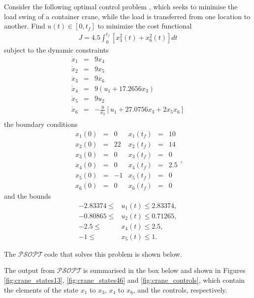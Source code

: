 \documentclass[a4paper,11pt]{report}    %
\newcommand{\psopt}{$\mathcal{PSOPT}$\,}  %
\newenvironment{shadedframe}{%
  \def\FrameCommand{\fcolorbox{black}{shadecolor}}%
  \MakeFramed {\FrameRestore}}
{\endMakeFramed}
\begin{document}
Consider the following optimal control problem \cite{Teo:91}, which seeks to minimise
the load swing of a container crane, while the load is transferred from one location
to another.  Find  $u(t) \in [0, t_f]$ to minimize the cost functional
\begin{equation}
\begin{aligned}
  J = 4.5 \int_{0}^{t_f} \left[ x_3^2(t) + x_6^2(t) \right] dt
\end{aligned}
\end{equation}
subject to the dynamic constraints
\begin{equation}
  \begin{array}{lcl}
   \dot x_1 &=& 9 x_4 \\
   \dot x_2 &=& 9 x_5  \\
   \dot x_3 &=& 9 x_6  \\
   \dot x_4 &=& 9(u_1 + 17.2656 x_3)   \\
   \dot x_5 &=& 9 u_2  \\
   \dot x_6 &=& - \frac{9}{x_2}\left[ u_1 + 27.0756x_3 +2x_5x_6 \right]   \\
  \end{array}
\end{equation}
the boundary conditions
 \begin{equation}
  \begin{array}{cccccc}
   x_1(0) &=& 0   & x_1(t_f) &=& 10 \\
   x_2(0) &=& 22  & x_2(t_f) &=& 14\\
   x_3(0) &=& 0   & x_3(t_f) &=& 0\\
   x_4(0) &=& 0   & x_4(t_f) &=& 2.5 \\
   x_5(0) &=& -1  & x_5(t_f) &=& 0\\
   x_6(0) &=& 0   & x_6(t_f) &=& 0 
  \end{array},
\end{equation}
and the  bounds
\begin{equation}
\begin{aligned}
  -2.83374 \le &u_1(t) \le 2.83374,\\
  -0.80865 \le &u_2(t) \le 0.71265,\\
-2.5 \le &x_4(t) \le 2.5,\\
-1 \le &x_5(t) \le 1.
\end{aligned}
\end{equation}

The
\psopt code that solves this problem is shown below.  

\tiny
\begin{shadedframe}

\end{shadedframe}
\normalsize
The output from \psopt is summarised in the box below and shown in Figures \ref{fig:crane_states13}, \ref{fig:crane_states46} and \ref{fig:crane_controls}, which contain the elements
of the state $x_1$ to $x_3$, $x_4$ to $x_6$, and the controls, respectively.
\end{document}
